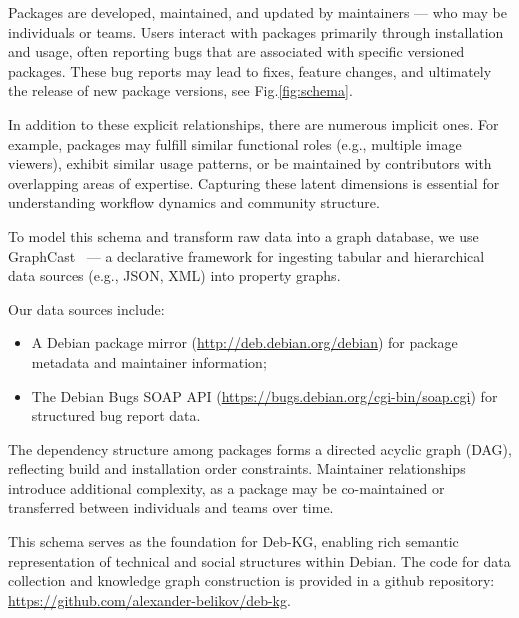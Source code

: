 \documentclass[10pt,oneside,a4paper, twocolumn]{article}
\begin{document}
    Packages are developed, maintained, and updated by maintainers — who may be individuals or teams.
    Users interact with packages primarily through installation and usage, often reporting bugs that are associated with specific versioned packages.
    These bug reports may lead to fixes, feature changes, and ultimately the release of new package versions, see Fig.\ref{fig:schema}.

    In addition to these explicit relationships, there are numerous implicit ones.
    For example, packages may fulfill similar functional roles (e.g., multiple image viewers), exhibit similar usage patterns, or be maintained by contributors with overlapping areas of expertise.
    Capturing these latent dimensions is essential for understanding workflow dynamics and community structure.

    To model this schema and transform raw data into a graph database, we use GraphCast~\cite{graphcast} — a declarative framework for ingesting tabular and hierarchical data sources (e.g., JSON, XML) into property graphs.

    Our data sources include:
    \begin{itemize}
        \item A Debian package mirror (\url{http://deb.debian.org/debian}) for package metadata and maintainer information;
        \item The Debian Bugs SOAP API (\url{https://bugs.debian.org/cgi-bin/soap.cgi}) for structured bug report data.
    \end{itemize}

    The dependency structure among packages forms a directed acyclic graph (DAG), reflecting build and installation order constraints.
    Maintainer relationships introduce additional complexity, as a package may be co-maintained or transferred between individuals and teams over time.

    This schema serves as the foundation for Deb-KG, enabling rich semantic representation of technical and social structures within Debian.
    The code for data collection and knowledge graph construction is provided in a github repository: \url{https://github.com/alexander-belikov/deb-kg}.
\end{document}

